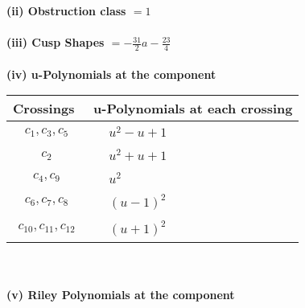 \documentclass[1p]{elsarticle_modified}
\theoremstyle{definition}
\begin{document}
\flushleft \textbf{(ii) Obstruction class $= 1$}\\~\\
\flushleft \textbf{(iii) Cusp Shapes $= -\frac{31}{2} a-\frac{23}{4}$}\\~\\
\newpage\renewcommand{\arraystretch}{1}
\flushleft \textbf{(iv) u-Polynomials at the component}\newline \\
\begin{tabular}{m{50pt}|m{274pt}}
Crossings & \hspace{64pt}u-Polynomials at each crossing \\
\hline $$\begin{aligned}c_{1},c_{3},c_{5}\end{aligned}$$&$\begin{aligned}
&u^2- u+1
\end{aligned}$\\
\hline $$\begin{aligned}c_{2}\end{aligned}$$&$\begin{aligned}
&u^2+u+1
\end{aligned}$\\
\hline $$\begin{aligned}c_{4},c_{9}\end{aligned}$$&$\begin{aligned}
&u^2
\end{aligned}$\\
\hline $$\begin{aligned}c_{6},c_{7},c_{8}\end{aligned}$$&$\begin{aligned}
&(u-1)^2
\end{aligned}$\\
\hline $$\begin{aligned}c_{10},c_{11},c_{12}\end{aligned}$$&$\begin{aligned}
&(u+1)^2
\end{aligned}$\\
\hline
\end{tabular}\\~\\
\newpage\renewcommand{\arraystretch}{1}
\flushleft \textbf{(v) Riley Polynomials at the component}\newline \\
\end{document}
